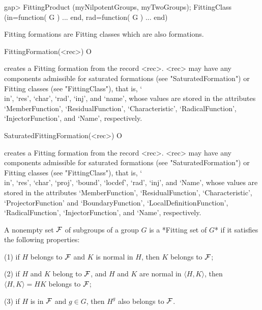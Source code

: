 \beginexample
gap> FittingProduct (myNilpotentGroups, myTwoGroups);
FittingClass (in=function( G ) ... end, rad=function( G ) ... end)
\endexample


Fitting formations are Fitting classes which are also formations.

\>FittingFormation(<rec>) O

creates a Fitting formation from the record <rec>. <rec> may have any
components admissible for saturated formations (see "SaturatedFormation") or
Fitting classes (see "FittingClass"), that is, `\\in', `res', `char', `rad',
`inj', and `name', 
 whose values are stored in the attributes `MemberFunction',
`ResidualFunction', `Characteristic',  `RadicalFunction',
`InjectorFunction',  and `Name', respectively.

\>SaturatedFittingFormation(<rec>) O

creates a Fitting formation from the record <rec>. <rec> may have any
components admissible for saturated formations (see "SaturatedFormation") or
Fitting classes (see "FittingClass"), that is, `\\in', `res', `char', `proj',
`bound', `locdef', `rad', `inj',  and `Name', whose values are stored in the
attributes `MemberFunction', `ResidualFunction', `Characteristic', 
`ProjectorFunction' and `BoundaryFunction',  `LocalDefinitionFunction',
`RadicalFunction', `InjectorFunction', and `Name', respectively.




A nonempty set $\cal F$ of subgroups of a group $G$ is a *Fitting set of
$G$*  if it satisfies the following properties:

\beginlist
\item{(1)} if $H$ belongs to $\cal F$ and $K$ is normal in $H$, then $K$ 
           belongs to $\cal F$;
         
\item{(2)} if $H$ and $K$ belong to $\cal F$, and $H$ and $K$ are normal in
$\langle H, K \rangle$, then $\langle H, K \rangle = H K$ belongs to $\cal
F$;
         
\item{(3)} if $H$ is in $\cal F$ and $g \in G$, then $H^g$ also belongs to 
           $\cal F$.
\endlist

